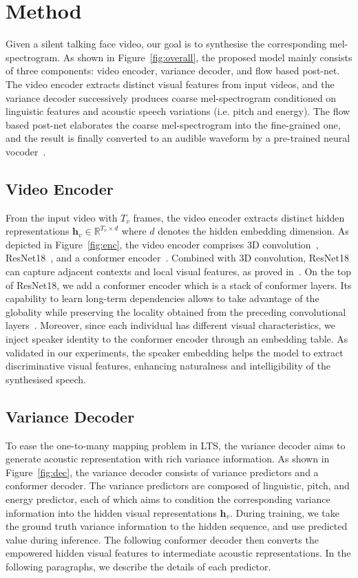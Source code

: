 \documentclass[letterpaper]{article} %
\begin{document}
\section{Method}
Given a silent talking face video, our goal is to synthesise the corresponding mel-spectrogram. As shown in Figure~\ref{fig:overall}, the proposed model mainly consists of three components: video encoder, variance decoder, and flow based post-net. The video encoder extracts distinct visual features from input videos, and the variance decoder successively produces coarse mel-spectrogram conditioned on linguistic features and acoustic speech variations (i.e. pitch and energy). The flow based post-net elaborates the coarse mel-spectrogram into the fine-grained one, and the result is finally converted to an audible waveform by a pre-trained neural vocoder~\cite{kim21f_interspeech}.

\subsection{Video Encoder}
From the input video with $T_v$ frames, the video encoder extracts distinct hidden representations $\boldsymbol{h}_v\in\mathbb{R}^{T_v\times d}$ where $d$ denotes the hidden embedding dimension.
As depicted in Figure~\ref{fig:enc}, the video encoder comprises 3D convolution~\cite{ji20123d}, ResNet18~\cite{he2016deep}, and a conformer encoder~\cite{gulati2020conformer}.
Combined with 3D convolution, ResNet18 can capture adjacent contexts and local visual features, as proved in~\cite{petridis2018end,ma2022visual}.
On the top of ResNet18, we add a conformer encoder which is a stack of conformer layers.
Its capability to learn long-term dependencies allows to take advantage of the globality while preserving the locality obtained from the preceding convolutional layers~\cite{guo2022cmt}.
Moreover, since each individual has different visual characteristics, we inject speaker identity to the conformer encoder through an embedding table.
As validated in our experiments, the speaker embedding helps the model to extract discriminative visual features, enhancing naturalness and intelligibility of the synthesised speech.

\subsection{Variance Decoder}
To ease the one-to-many mapping problem in LTS, the variance decoder aims to generate acoustic representation with rich variance information.
As shown in Figure~\ref{fig:dec}, the variance decoder consists of variance predictors and a conformer decoder.
The variance predictors are composed of linguistic, pitch, and energy predictor, each of which aims to condition the corresponding variance information into the hidden visual representations $\boldsymbol{h}_v$.
During training, we take the ground truth variance information to the hidden sequence, and use predicted value during inference.
The following conformer decoder then converts the empowered hidden visual features to intermediate acoustic representations.
In the following paragraphs, we describe the details of each predictor.
\end{document}
